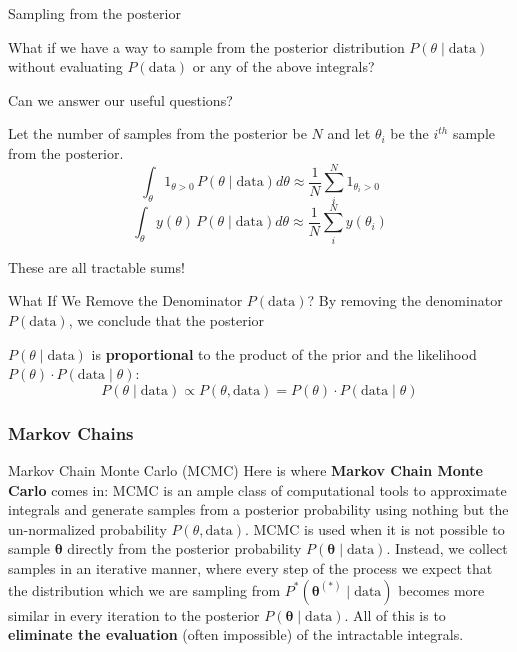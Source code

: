 \begin{frame}{Sampling from the posterior}
	\begin{vfilleditems}
		\item What if we have a way to sample from the posterior distribution $P(\theta \mid \text{data})$ without evaluating $P(\text{data})$ or any of the above integrals?
		\item Can we answer our useful questions?
		\item Let the number of samples from the posterior be $N$ and let $\theta_i$ be the $i^{th}$ sample from the posterior.
		$$
			\int_{\theta} 1_{\theta > 0} \, P(\theta \mid \text{data}) d\theta \approx \frac{1}{N} \sum_i^N 1_{\theta_i > 0}
		$$
		$$
			\int_{\theta} y(\theta) \, P(\theta \mid \text{data}) d\theta \approx \frac{1}{N} \sum_i^N y(\theta_i)
		$$
		\item These are all tractable sums!
	\end{vfilleditems}
\end{frame}

\begin{frame}{What If We Remove the Denominator $P(\text{data})$?}
	By removing the denominator $P(\text{data})$,
	we conclude that the posterior

	$P(\theta \mid \text{data})$ is \textbf{proportional} to the
	product of the prior and the likelihood
	$P(\theta) \cdot P(\text{data} \mid \theta)$:
	$$
		P(\theta \mid \text{data}) \propto P(\theta, \text{data}) = P(\theta) \cdot P(\text{data} \mid \theta)
	$$
\end{frame}

\subsubsection{Markov Chains}
\begin{frame}{Markov Chain Monte Carlo (MCMC)}
	Here is where \textbf{Markov Chain Monte Carlo} comes in:
	\vfill
	MCMC is an ample class of computational tools to approximate integrals
	and generate samples from a posterior probability
	\parencite{brooksHandbookMarkovChain2011} using nothing but the un-normalized probability $P(\theta, \text{data})$.
	\vfill
	MCMC is used when it is not possible to sample $\boldsymbol{\theta}$
	directly from the posterior probability
	$P(\boldsymbol{\theta} \mid \text{data})$.
	Instead, we collect samples in an iterative manner,
	where every step of the process we expect that the distribution which we are sampling from
	$P^*(\boldsymbol{\theta}^{(*)} \mid \text{data})$
	becomes more similar in every iteration to the posterior
	$P(\boldsymbol{\theta} \mid \text{data})$.
	\vfill
	All of this is to \textbf{eliminate the evaluation}
	(often impossible) of the intractable integrals.
\end{frame}

